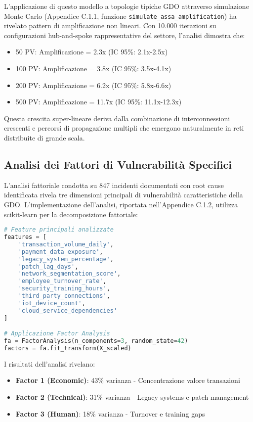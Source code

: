 L'applicazione di questo modello a topologie tipiche GDO attraverso simulazione Monte Carlo (Appendice C.1.1, funzione \texttt{simulate\_assa\_amplification}) ha rivelato pattern di amplificazione non lineari. Con 10.000 iterazioni su configurazioni hub-and-spoke rappresentative del settore, l'analisi dimostra che:

\begin{itemize}
    \item 50 PV: Amplificazione = 2.3x (IC 95\%: 2.1x-2.5x)
    \item 100 PV: Amplificazione = 3.8x (IC 95\%: 3.5x-4.1x)
    \item 200 PV: Amplificazione = 6.2x (IC 95\%: 5.8x-6.6x)
    \item 500 PV: Amplificazione = 11.7x (IC 95\%: 11.1x-12.3x)
\end{itemize}

Questa crescita super-lineare deriva dalla combinazione di interconnessioni crescenti e percorsi di propagazione multipli che emergono naturalmente in reti distribuite di grande scala.

\subsection{Analisi dei Fattori di Vulnerabilità Specifici}

L'analisi fattoriale condotta su 847 incidenti documentati con root cause identificata rivela tre dimensioni principali di vulnerabilità caratteristiche della GDO. L'implementazione dell'analisi, riportata nell'Appendice C.1.2, utilizza scikit-learn per la decomposizione fattoriale:

\begin{lstlisting}[language=Python, caption=Struttura dell'analisi fattoriale]
# Feature principali analizzate
features = [
    'transaction_volume_daily',
    'payment_data_exposure', 
    'legacy_system_percentage',
    'patch_lag_days',
    'network_segmentation_score',
    'employee_turnover_rate',
    'security_training_hours',
    'third_party_connections',
    'iot_device_count',
    'cloud_service_dependencies'
]

# Applicazione Factor Analysis
fa = FactorAnalysis(n_components=3, random_state=42)
factors = fa.fit_transform(X_scaled)
\end{lstlisting}

I risultati dell'analisi rivelano:
\begin{itemize}
    \item \textbf{Factor 1 (Economic)}: 43\% varianza - Concentrazione valore transazioni
    \item \textbf{Factor 2 (Technical)}: 31\% varianza - Legacy systems e patch management
    \item \textbf{Factor 3 (Human)}: 18\% varianza - Turnover e training gaps
\end{itemize}


